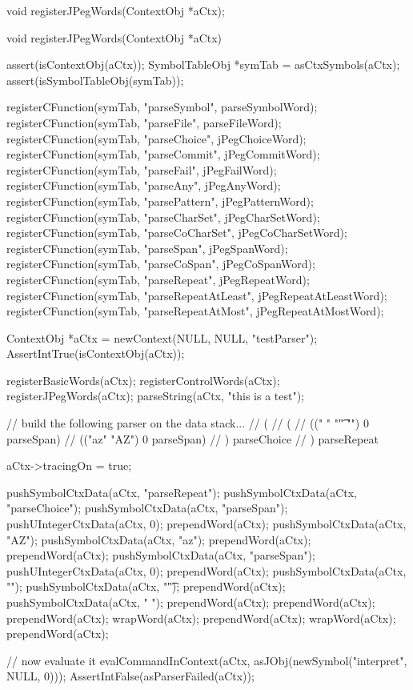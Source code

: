 \startCHeader
void registerJPegWords(ContextObj *aCtx);
\stopCHeader

\startCCode
void registerJPegWords(ContextObj *aCtx) {
  assert(isContextObj(aCtx));
  SymbolTableObj *symTab = asCtxSymbols(aCtx);
  assert(isSymbolTableObj(symTab));
  
  registerCFunction(symTab, "parseSymbol",        parseSymbolWord);
  registerCFunction(symTab, "parseFile",          parseFileWord);
  registerCFunction(symTab, "parseChoice",        jPegChoiceWord);
  registerCFunction(symTab, "parseCommit",        jPegCommitWord);
  registerCFunction(symTab, "parseFail",          jPegFailWord);
  registerCFunction(symTab, "parseAny",           jPegAnyWord);
  registerCFunction(symTab, "parsePattern",       jPegPatternWord);
  registerCFunction(symTab, "parseCharSet",       jPegCharSetWord);
  registerCFunction(symTab, "parseCoCharSet",     jPegCoCharSetWord);
  registerCFunction(symTab, "parseSpan",          jPegSpanWord);
  registerCFunction(symTab, "parseCoSpan",        jPegCoSpanWord);
  registerCFunction(symTab, "parseRepeat",        jPegRepeatWord);
  registerCFunction(symTab, "parseRepeatAtLeast", jPegRepeatAtLeastWord);
  registerCFunction(symTab, "parseRepeatAtMost",  jPegRepeatAtMostWord);
}
\stopCCode


\startTestSuite[parser]

\startTestCase[should ??]

\startCTest
  ContextObj *aCtx = newContext(NULL, NULL, "testParser");
  AssertIntTrue(isContextObj(aCtx));
  
  registerBasicWords(aCtx);
  registerControlWords(aCtx);
  registerJPegWords(aCtx);
  parseString(aCtx, "this is a test");

  // build the following parser on the data stack...
  // ( 
  //   (
  //     ((" " "\t" "\n") 0 parseSpan)
  //     (("az" "AZ") 0 parseSpan)
  //   ) parseChoice
  // ) parseRepeat

  aCtx->tracingOn = true;

  pushSymbolCtxData(aCtx, "parseRepeat");
  pushSymbolCtxData(aCtx, "parseChoice");
  pushSymbolCtxData(aCtx, "parseSpan");
  pushUIntegerCtxData(aCtx, 0);
  prependWord(aCtx);
  pushSymbolCtxData(aCtx, "AZ");
  pushSymbolCtxData(aCtx, "az");
  prependWord(aCtx);
  prependWord(aCtx);
  pushSymbolCtxData(aCtx, "parseSpan");
  pushUIntegerCtxData(aCtx, 0);
  prependWord(aCtx);
  pushSymbolCtxData(aCtx, "\n");
  pushSymbolCtxData(aCtx, "\t");
  prependWord(aCtx);
  pushSymbolCtxData(aCtx, " ");
  prependWord(aCtx);
  prependWord(aCtx);
  prependWord(aCtx);
  wrapWord(aCtx);
  prependWord(aCtx);
  wrapWord(aCtx);
  prependWord(aCtx);
  
  // now evaluate it
  evalCommandInContext(aCtx, asJObj(newSymbol("interpret", NULL, 0)));
  AssertIntFalse(asParserFailed(aCtx));
\stopCTest
\stopTestCase
\stopTestSuite